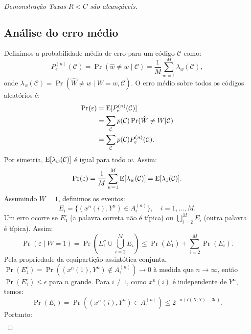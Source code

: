 \begin{proof}[Demonstração Taxas $R < C$ são alcançáveis]
\subsection*{Análise do erro médio}
Definimos a probabilidade média de erro para um código $\mathcal{C}$ como:
\begin{equation}
P_e^{(n)}(\mathcal{C}) = \Pr(\hat{w} \neq w \mid \mathcal{C}) = \frac{1}{M} \sum_{w=1}^M \lambda_w(\mathcal{C}),
\end{equation}
onde $\lambda_w(\mathcal{C}) = \Pr(\hat{W} \neq w \mid W=w, \mathcal{C})$. O erro médio sobre todos os códigos aleatórios é:
\begin{subequations}
  \begin{align}
    \Pr(\varepsilon) &= \mathrm{E}[P_e^{(n)}(\mathcal{C})] \\
                     &= \sum_{\mathcal{C}} p(\mathcal{C}) \Pr(\hat{W} \neq W | \mathcal{C}) \\
                     &= \sum_{\mathcal{C}} p(\mathcal{C}) P_e^{(n)}(\mathcal{C}) .
  \end{align}
\end{subequations}
Por simetria, $\mathrm{E}[\lambda_w(\mathcal{C})]$ é igual para todo $w$. Assim:
\begin{equation}
\Pr(\varepsilon) = \frac{1}{M} \sum_{w=1}^M \mathrm{E}[\lambda_w(\mathcal{C})] = \mathrm{E}[\lambda_1(\mathcal{C})].
\end{equation}
Assumindo $W=1$, definimos os eventos:
\begin{equation}
E_i = \{(x^n(i), Y^n) \in A_{\epsilon}^{(n)}\}, \quad i=1, \ldots, M.
\end{equation}
Um erro ocorre se $E_1^c$ (a palavra correta não é típica) ou $\bigcup_{i=2}^M E_i$ (outra palavra é típica). Assim:
\begin{equation}
\Pr(\varepsilon \mid W=1) = \Pr\left( E_1^c \cup \bigcup_{i=2}^M E_i \right) \leq \Pr(E_1^c) + \sum_{i=2}^M \Pr(E_i).
\end{equation}
Pela propriedade da equipartição assintótica conjunta, $\Pr(E_1^c) = \Pr((x^n(1), Y^n) \notin A_{\epsilon}^{(n)}) \to 0$ à medida que $n \to \infty$, então $\Pr(E_1^c) \leq \epsilon$ para $n$ grande. Para $i \neq 1$, como $x^n(i)$ é independente de $Y^n$, temos:
\begin{equation}
\Pr(E_i) = \Pr((x^n(i), Y^n) \in A_{\epsilon}^{(n)}) \leq 2^{-n(I(X;Y) - 3\epsilon)}.
\end{equation}
Portanto:
\begin{subequations}
  \begin{align}

\end{align}
\end{subequations}
\end{proof}
